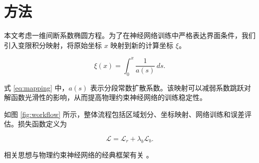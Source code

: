 \section{方法}
\label{sec:method}

本文考虑一维间断系数椭圆方程。为了在神经网络训练中严格表达界面条件，我们引入变限积分映射，将原始坐标 $x$ 映射到新的计算坐标 $\xi$。

\begin{equation}
\label{eq:mapping}
\xi(x)=\int_{0}^{x}\frac{1}{a(s)}\,ds .
\end{equation}

式 \ref{eq:mapping} 中，$a(s)$ 表示分段常数扩散系数。该映射可以减弱系数跳跃对解函数光滑性的影响，从而提高物理约束神经网络的训练稳定性。

如图 \ref{fig:workflow} 所示，整体流程包括区域划分、坐标映射、网络训练和误差评估。损失函数定义为

\begin{equation}
\label{eq:loss}
\mathcal{L}=\mathcal{L}_{r}+\lambda_b\mathcal{L}_{b}.
\end{equation}

相关思想与物理约束神经网络的经典框架有关 \cite{raissi2019physics}。
